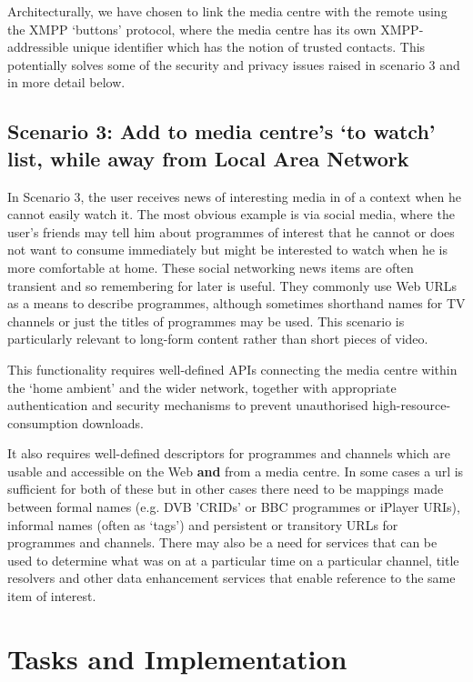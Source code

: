 \documentclass[]{article}%
\begin{document}
Architecturally, we have chosen to link the media centre with the remote using the XMPP `buttons' protocol, where the media centre has its own XMPP-addressible unique identifier which has the notion of trusted contacts. This potentially solves some of the security and privacy issues raised in scenario 3 and in more detail below. 


\subsection{Scenario 3: Add to media centre's `to watch' list, while away from Local Area Network}

In Scenario 3, the user receives news of interesting media in of a context when he cannot easily watch it. The most obvious example is via social media, where the user's friends may tell him about programmes of interest that he cannot or does not want to consume immediately but might be interested to watch when he is more comfortable at home. These social networking news items are often transient and so remembering for later is useful. They commonly use Web URLs as a means to describe programmes, although sometimes shorthand names for TV channels or just the titles of programmes may be used. This scenario is particularly relevant to long-form content rather than short pieces of video.

This functionality requires well-defined APIs connecting the media centre within the `home ambient' and the wider network, together with appropriate authentication and security mechanisms to prevent unauthorised high-resource-consumption downloads. 

It also requires well-defined descriptors for programmes and channels which are usable and accessible on the Web {\bf and} from a media centre. In some cases a url is sufficient for both of these but in other cases there need to be mappings made between formal names (e.g. DVB 'CRIDs' or BBC programmes or iPlayer URIs), informal names (often as `tags') and persistent or transitory URLs for programmes and channels. There may also be a need for services that can be used to determine what was on at a particular time on a particular channel, title resolvers and other data enhancement services that enable reference to the same item of interest.



\section{Tasks and Implementation}
\end{document}
